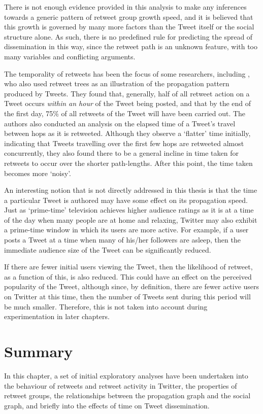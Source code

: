 There is not enough evidence provided in this analysis to make any inferences towards a generic pattern of retweet group growth speed, and it is believed that this growth is governed by many more factors than the Tweet itself or the social structure alone. As such, there is no predefined rule for predicting the spread of dissemination in this way, since the retweet path is an unknown feature, with too many variables and conflicting arguments.

The temporality of retweets has been the focus of some researchers, including \citet{kwak10}, who also used retweet trees as an illustration of the propagation pattern produced by Tweets. They found that, generally, half of all retweet action on a Tweet occurs \textit{within an hour} of the Tweet being posted, and that by the end of the first day, 75\% of all retweets of the Tweet will have been carried out. The authors also conducted an analysis on the elapsed time of a Tweet's travel between hops as it is retweeted. Although they observe a `flatter' time initially, indicating that Tweets travelling over the first few hops are retweeted almost concurrently, they also found there to be a general incline in time taken for retweets to occur over the shorter path-lengths. After this point, the time taken becomes more `noisy'. 

An interesting notion that is not directly addressed in this thesis is that the time a particular Tweet is authored may have some effect on its propagation speed. Just as `prime-time' television achieves higher audience ratings as it is at a time of the day when many people are at home and relaxing, Twitter may also exhibit a prime-time window in which its users are more active. For example, if a user posts a Tweet at a time when many of his/her followers are asleep, then the immediate audience size of the Tweet can be significantly reduced.

If there are fewer initial users viewing the Tweet, then the likelihood of retweet, as a function of this, is also reduced. This could have an effect on the perceived popularity of the Tweet, although since, by definition, there are fewer active users on Twitter at this time, then the number of Tweets sent during this period will be much smaller. Therefore, this is not taken into account during experimentation in later chapters.


\section{Summary}
In this chapter, a set of initial exploratory analyses have been undertaken into the behaviour of retweets and retweet activity in Twitter, the properties of retweet groups, the relationships between the propagation graph and the social graph, and briefly into the effects of time on Tweet dissemination.

